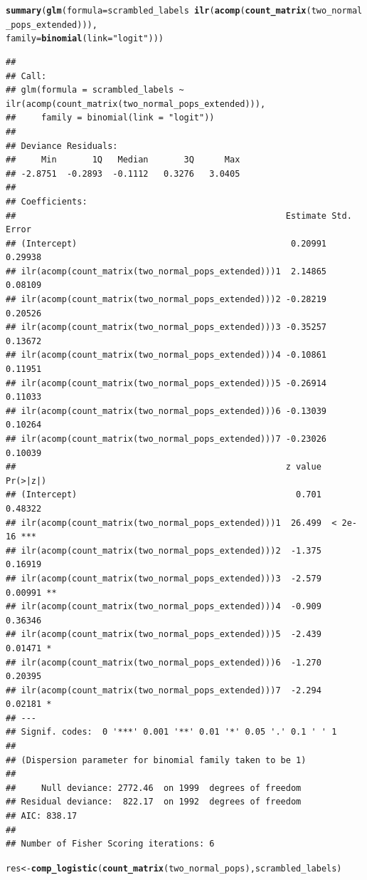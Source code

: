 \documentclass{article}\usepackage[]{graphicx}\usepackage[]{color}
\makeatletter
\newcommand{\hlstr}[1]{\textcolor[rgb]{0.192,0.494,0.8}{#1}}%
\newcommand{\hlopt}[1]{\textcolor[rgb]{0,0,0}{#1}}%
\newcommand{\hlstd}[1]{\textcolor[rgb]{0.345,0.345,0.345}{#1}}%
\newcommand{\hlkwb}[1]{\textcolor[rgb]{0.69,0.353,0.396}{#1}}%
\newcommand{\hlkwc}[1]{\textcolor[rgb]{0.333,0.667,0.333}{#1}}%
\newcommand{\hlkwd}[1]{\textcolor[rgb]{0.737,0.353,0.396}{\textbf{#1}}}%
\newenvironment{kframe}{%
 \def\at@end@of@kframe{}%
 \ifinner\ifhmode%
  \def\at@end@of@kframe{\end{minipage}}%
  \begin{minipage}{\columnwidth}%
 \fi\fi%
 \def\FrameCommand##1{\hskip\@totalleftmargin \hskip-\fboxsep
 \colorbox{shadecolor}{##1}\hskip-\fboxsep
     \hskip-\linewidth \hskip-\@totalleftmargin \hskip\columnwidth}%
 \MakeFramed {\advance\hsize-\width
   \@totalleftmargin\z@ \linewidth\hsize
   \@setminipage}}%
 {\par\unskip\endMakeFramed%
 \at@end@of@kframe}
\newenvironment{knitrout}{}{} %
\makeatother
\begin{document}
\begin{knitrout}
\begin{kframe}
\begin{alltt}
\hlkwd{summary}\hlstd{(}\hlkwd{glm}\hlstd{(}\hlkwc{formula} \hlstd{= scrambled_labels} \hlopt{~} \hlkwd{ilr}\hlstd{(}\hlkwd{acomp}\hlstd{(}\hlkwd{count_matrix}\hlstd{(two_normal_pops_extended))),}
            \hlkwc{family} \hlstd{=} \hlkwd{binomial}\hlstd{(}\hlkwc{link} \hlstd{=} \hlstr{"logit"}\hlstd{)))}
\end{alltt}
\begin{verbatim}
## 
## Call:
## glm(formula = scrambled_labels ~ ilr(acomp(count_matrix(two_normal_pops_extended))), 
##     family = binomial(link = "logit"))
## 
## Deviance Residuals: 
##     Min       1Q   Median       3Q      Max  
## -2.8751  -0.2893  -0.1112   0.3276   3.0405  
## 
## Coefficients:
##                                                     Estimate Std. Error
## (Intercept)                                          0.20991    0.29938
## ilr(acomp(count_matrix(two_normal_pops_extended)))1  2.14865    0.08109
## ilr(acomp(count_matrix(two_normal_pops_extended)))2 -0.28219    0.20526
## ilr(acomp(count_matrix(two_normal_pops_extended)))3 -0.35257    0.13672
## ilr(acomp(count_matrix(two_normal_pops_extended)))4 -0.10861    0.11951
## ilr(acomp(count_matrix(two_normal_pops_extended)))5 -0.26914    0.11033
## ilr(acomp(count_matrix(two_normal_pops_extended)))6 -0.13039    0.10264
## ilr(acomp(count_matrix(two_normal_pops_extended)))7 -0.23026    0.10039
##                                                     z value Pr(>|z|)    
## (Intercept)                                           0.701  0.48322    
## ilr(acomp(count_matrix(two_normal_pops_extended)))1  26.499  < 2e-16 ***
## ilr(acomp(count_matrix(two_normal_pops_extended)))2  -1.375  0.16919    
## ilr(acomp(count_matrix(two_normal_pops_extended)))3  -2.579  0.00991 ** 
## ilr(acomp(count_matrix(two_normal_pops_extended)))4  -0.909  0.36346    
## ilr(acomp(count_matrix(two_normal_pops_extended)))5  -2.439  0.01471 *  
## ilr(acomp(count_matrix(two_normal_pops_extended)))6  -1.270  0.20395    
## ilr(acomp(count_matrix(two_normal_pops_extended)))7  -2.294  0.02181 *  
## ---
## Signif. codes:  0 '***' 0.001 '**' 0.01 '*' 0.05 '.' 0.1 ' ' 1
## 
## (Dispersion parameter for binomial family taken to be 1)
## 
##     Null deviance: 2772.46  on 1999  degrees of freedom
## Residual deviance:  822.17  on 1992  degrees of freedom
## AIC: 838.17
## 
## Number of Fisher Scoring iterations: 6
\end{verbatim}
\begin{alltt}
\hlstd{res} \hlkwb{<-} \hlkwd{comp_logistic}\hlstd{(}\hlkwd{count_matrix}\hlstd{(two_normal_pops), scrambled_labels)}
\end{alltt}



\end{kframe}
\end{knitrout}
\end{document}
